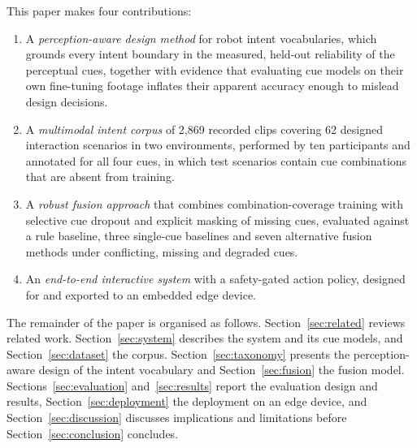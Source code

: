 This paper makes four contributions:
\begin{enumerate}
  \item A \emph{perception-aware design method} for robot intent vocabularies,
        which grounds every intent boundary in the measured, held-out
        reliability of the perceptual cues, together with evidence that
        evaluating cue models on their own fine-tuning footage inflates
        their apparent accuracy enough to mislead design decisions.
  \item A \emph{multimodal intent corpus} of 2,869 recorded clips covering 62
        designed interaction scenarios in two environments, performed by ten
        participants and annotated for all four cues, in which test scenarios
        contain cue combinations that are absent from training.
  \item A \emph{robust fusion approach} that combines combination-coverage
        training with selective cue dropout and explicit masking of missing
        cues, evaluated against a rule baseline, three single-cue baselines and
        seven alternative fusion methods under conflicting, missing and
        degraded cues.
  \item An \emph{end-to-end interactive system} with a safety-gated action
        policy, designed for and exported to an embedded edge device.
\end{enumerate}

The remainder of the paper is organised as follows.
Section~\ref{sec:related} reviews related work. Section~\ref{sec:system}
describes the system and its cue models, and Section~\ref{sec:dataset} the
corpus. Section~\ref{sec:taxonomy} presents the perception-aware design of the
intent vocabulary and Section~\ref{sec:fusion} the fusion model.
Sections~\ref{sec:evaluation} and~\ref{sec:results} report the evaluation
design and results, Section~\ref{sec:deployment} the deployment on an edge
device, and Section~\ref{sec:discussion} discusses implications and
limitations before Section~\ref{sec:conclusion} concludes.
